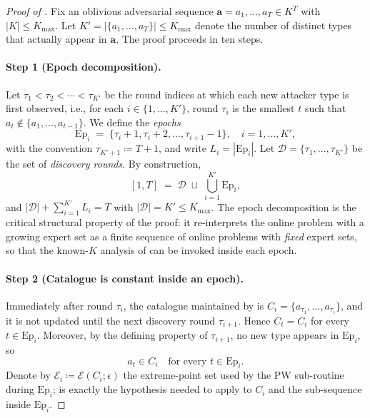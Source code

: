 \documentclass[letterpaper,9pt,twocolumn]{extarticle}
\newcommand{\avec}{\mathbf{a}}
\newcommand{\cE}{\mathcal{E}}
\newcommand{\Kmax}{K_{\max}}
\theoremstyle{plain}
\theoremstyle{definition}
\theoremstyle{remark}
\begin{document}
\begin{proof}[Proof of ]
Fix an oblivious adversarial sequence $\avec=a_1,\dots,a_T\in K^T$ with
$|K|\le\Kmax$. Let $K'=|\{a_1,\dots,a_T\}|\le\Kmax$ denote the number of
distinct types that actually appear in $\avec$. The proof proceeds in ten
steps.

\paragraph{Step 1 (Epoch decomposition).}
Let $\tau_1<\tau_2<\cdots<\tau_{K'}$ be the round indices at which each
new attacker type is first observed, i.e., for each
$i\in\{1,\dots,K'\}$, round $\tau_i$ is the smallest $t$ such that
$a_t\notin\{a_1,\dots,a_{t-1}\}$. We define the \emph{epochs}
\begin{equation}
\mathrm{Ep}_i\;=\;\{\tau_i+1,\tau_i+2,\dots,\tau_{i+1}-1\},\quad
i=1,\dots,K',
\label{eq:epoch-def}
\end{equation}
with the convention $\tau_{K'+1}\coloneqq T+1$, and write
$L_i=|\mathrm{Ep}_i|$. Let
$\mathcal{D}=\{\tau_1,\dots,\tau_{K'}\}$ be the set of \emph{discovery
rounds}. By construction,
\[
[1,T]\;=\;\mathcal{D}\;\sqcup\;\bigcup_{i=1}^{K'}\mathrm{Ep}_i,
\]
and
$|\mathcal{D}|+\sum_{i=1}^{K'}L_i=T$ with $|\mathcal{D}|=K'\le\Kmax$. The
epoch decomposition is the critical structural property of the proof: it
re-interprets the online problem with a growing expert set as a finite
sequence of online problems with \emph{fixed} expert sets, so that the
known-$K$ analysis of \citet{balcan2015} can be invoked inside each
epoch.

\paragraph{Step 2 (Catalogue is constant inside an epoch).}
Immediately after round $\tau_i$, the catalogue maintained by
 is $C_i=\{a_{\tau_1},\dots,a_{\tau_i}\}$, and it is not
updated until the next discovery round $\tau_{i+1}$. Hence $C_t=C_i$ for
every $t\in\mathrm{Ep}_i$. Moreover, by the defining property of
$\tau_{i+1}$, no new type appears in $\mathrm{Ep}_i$, so
\begin{equation}
a_t\in C_i\quad\text{for every }t\in\mathrm{Ep}_i.
\label{eq:epoch-types}
\end{equation}
Denote by $\cE_i\coloneqq\cE(C_i;\epsilon)$ the extreme-point set
used by the PW sub-routine during $\mathrm{Ep}_i$; 
is exactly the hypothesis needed to apply  to $C_i$ and the
sub-sequence inside $\mathrm{Ep}_i$.


\end{proof}
\end{document}
